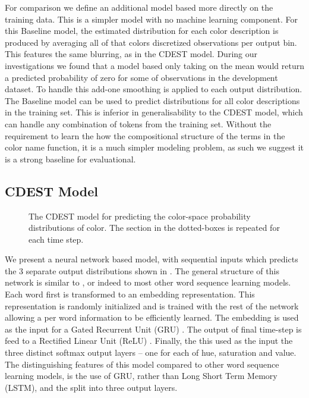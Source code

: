 \documentclass[11pt,letterpaper]{article}
\newcommand{\parencite}{\cite}
\newcommand{\textcite}{\newcite}
\begin{document}
For comparison we define an additional model based more directly on the training data.
This is a simpler model with no machine learning component.
For this Baseline model, the estimated distribution for each color description is produced by averaging all of that colors discretized observations per output bin.
This features the same blurring, as in the CDEST model.
During our investigations we found that a model based only taking on the mean would return a predicted probability of zero for some of observations in the development dataset.
To handle this add-one smoothing is applied to each output distribution.
The Baseline model can be used to predict distributions for all color descriptions in the training set.
This is inferior in generalisability to the CDEST model, which can handle any combination of tokens from the training set.
Without the requirement to learn the how the compositional structure of the terms in the color name function, it is a much simpler modeling problem, as such we suggest it is a strong baseline for evaluational.

\subsection{CDEST Model}

\begin{figure}
	\resizebox{\columnwidth}{!}{}
	
	\caption{\label{network}
		The CDEST model for predicting the color-space probability distributions of color.
		The section in the dotted-boxes is repeated for each time step.
	}
\end{figure}

We present a neural network based model, with sequential inputs which predicts the 3 separate output distributions shown in . The general structure of this network is similar to \textcite{2016arXiv160603821M}, or indeed to most other word sequence learning models.
Each word first is transformed to an embedding representation.
This representation is randomly initialized and is trained with the rest of the network allowing a per word information to be efficiently learned.
The embedding is used as the input for a Gated Recurrent Unit (GRU)  \parencite{cho2014properties}.
The output of final time-step is feed to a Rectified Linear Unit (ReLU)  \parencite{dahl2013reludropout}.
Finally, the this used as the input the three distinct softmax output layers -- one for each of hue, saturation and value.
The distinguishing features of this model compared to other word sequence learning models, is the use of GRU, rather than Long Short Term Memory (LSTM), and the split into three output layers.
\end{document}
